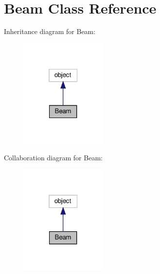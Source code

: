 \hypertarget{classpewpewlaz0rt4nk_1_1_beam}{}\section{Beam Class Reference}
\label{classpewpewlaz0rt4nk_1_1_beam}


Inheritance diagram for Beam\+:
\nopagebreak
\begin{figure}[H]
\begin{center}
\leavevmode
\includegraphics[width=123pt]{classpewpewlaz0rt4nk_1_1_beam__inherit__graph}
\end{center}
\end{figure}


Collaboration diagram for Beam\+:
\nopagebreak
\begin{figure}[H]
\begin{center}
\leavevmode
\includegraphics[width=123pt]{classpewpewlaz0rt4nk_1_1_beam__coll__graph}
\end{center}
\end{figure}
